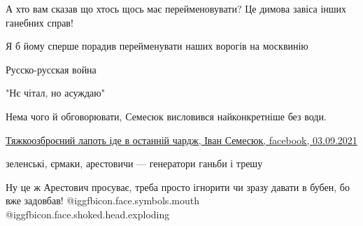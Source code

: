\begin{itemize}
А хто вам сказав що хтось щось має перейменовувати? Це димова завіса інших ганебних справ!

 
Я б йому сперше порадив перейменувати наших ворогів на москвинію

 
Русско-русская война

 
"Нє чітал, но асуждаю"

 

Нема чого й обговорювати, Семесюк висловився найконкретніше без води.

\href{https://www.facebook.com/ivan.semesyuk/posts/4649164168467447}{%
Тяжкоозброєний лапоть іде в останній чардж, Іван Семесюк, facebook, 03.09.2021%
}


зеленські, єрмаки, арестовичи — генератори ганьби і трешу

 
Ну це ж Арестович просуває, треба просто ігнорити чи зразу давати в бубен, бо вже задовбав!  @igg{fbicon.face.symbols.mouth}  @igg{fbicon.face.shoked.head.exploding} 



\end{itemize}
